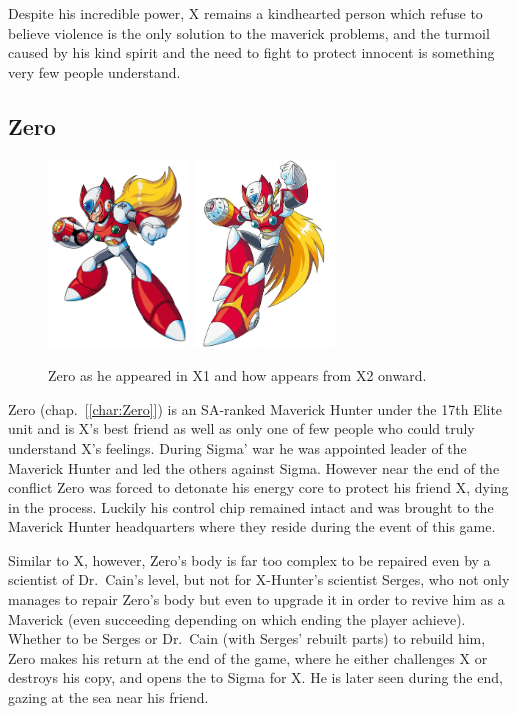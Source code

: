 Despite his incredible power, X remains a kindhearted person which refuse to believe violence is the only solution to the maverick problems, and the turmoil caused by his kind spirit and the need to fight to protect innocent is something very few people understand\cite{Xcoll1:Manual_X2}.

\subsection{Zero}

\begin{figure}[htp]
	\centering
	\includegraphics[height=5cm]{figures/X1/Zero_X1.png}
	\includegraphics[height=5cm]{figures/X2/Hunter_stages/Zero.png}
	\caption{Zero as he appeared in X1 and how appears from X2 onward.}
\end{figure}

Zero (chap.~[\ref{char:Zero}]) is an SA-ranked Maverick Hunter under the 17th Elite unit and is X's best friend as well as only one of few people who could truly understand X's feelings. During Sigma' war he was appointed leader of the Maverick Hunter and led the others against Sigma. However near the end of the conflict Zero was forced to detonate his energy core to protect his friend X, dying in the process. Luckily his control chip remained intact and was brought to the Maverick Hunter headquarters where they reside during the event of this game.

Similar to X, however, Zero's body is far too complex to be repaired even by a scientist of Dr.~Cain's level, but not for X-Hunter's scientist Serges, who not only manages to repair Zero's body but even to upgrade it in order to revive him as a Maverick\cite{wayback:X2_resources} (even succeeding depending on which ending the player achieve). Whether to be Serges or Dr.~Cain (with Serges' rebuilt parts) to rebuild him, Zero makes his return at the end of the game, where he either challenges X or destroys his copy, and opens the to Sigma for X. He is later seen during the end, gazing at the sea near his friend.


